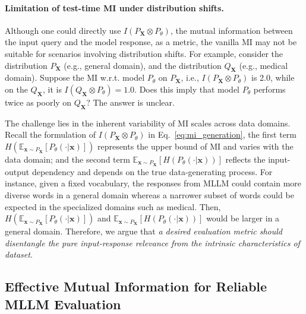 \paragraph{Limitation of test-time MI under distribution shifts.}
Although one could directly use $I(P_{\mathbf{X}} \otimes P_{\theta})$, the mutual information between the input query and the model response, as a metric, the vanilla MI may not be suitable for scenarios involving distribution shifts. For example, 
consider the distribution $P_{\mathbf{X}}$ (e.g., general domain), and the distribution $Q_{\mathbf{X}}$ (e.g., medical domain). Suppose the MI w.r.t. model $P_{\theta}$ on $P_{\mathbf{X}}$, i.e., $I(P_{\mathbf{X}}\otimes P_{{\theta}})$ is 2.0, while on the $Q_{\mathbf{X}}$, it is $I(Q_{\mathbf{X}}\otimes P_{{\theta}})=1.0$. Does this imply that model $P_\theta$ performs twice as poorly on $Q_{\mathbf{X}}$? The answer is unclear.

The challenge lies in the inherent variability of MI scales across data domains. Recall the formulation of
 $I(P_{\mathbf{X}}\otimes P_{\theta})$ in Eq.~\eqref{eq:mi_generation}, the first term $H(\mathbb{E}_{\mathbf{x}\sim P_{\mathbf{X}}}[P_{\theta}(\cdot|\mathbf{x})] )$ represents the upper bound of MI and varies with the data domain; and the second term $\mathbb{E}_{\mathbf{x}\sim P_{\mathbf{X}}} [H(P_{\theta}(\cdot|\mathbf{x}))]$ reflects the input-output dependency and depends on the true data-generating process.
For instance, given a fixed vocabulary, the responses from MLLM could contain more diverse words in a general domain whereas a narrower subset of words could be expected in the specialized domains such as medical. Then, $H(\mathbb{E}_{\mathbf{x}\sim P_{\mathbf{X}}}[P_{\theta}(\cdot|\mathbf{x})] )$ and $\mathbb{E}_{\mathbf{x}\sim P_{\mathbf{X}}}[H(P_{\theta}(\cdot|\mathbf{x}) )]$ would be larger in a general domain. Therefore, we argue that {\textit{a desired evaluation metric should disentangle the pure input-response relevance from the intrinsic characteristics of dataset}}.

\subsection{Effective Mutual Information for Reliable MLLM Evaluation} \label{sec:3_2_emi}

